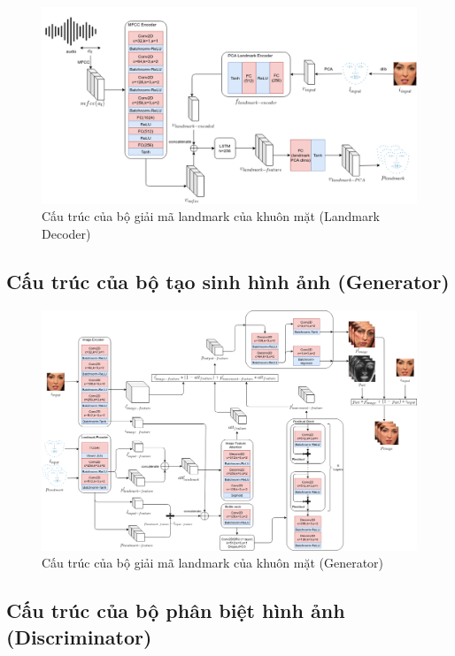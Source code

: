 \begin{figure}[H]
    \centering
    \includegraphics[width=15cm]{./content/materials/landmark_decoder.png}
    \caption{Cấu trúc của bộ giải mã landmark của khuôn mặt (Landmark Decoder)}
\end{figure}

\subsection{Cấu trúc của bộ tạo sinh hình ảnh (Generator)}

\begin{figure}[H]
    \centering
    \includegraphics[width=15cm]{./content/materials/generator.png}
    \caption{Cấu trúc của bộ giải mã landmark của khuôn mặt (Generator)}
\end{figure}

\subsection{Cấu trúc của bộ phân biệt hình ảnh (Discriminator)}

